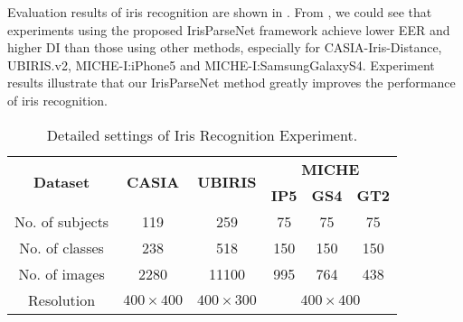 \documentclass[journal]{IEEEtran}
\begin{document}
Evaluation results of iris recognition are shown in .
From , we could see that experiments using the proposed IrisParseNet framework achieve lower EER and higher DI than those using other methods, especially for CASIA-Iris-Distance, UBIRIS.v2, MICHE-I:iPhone5 and MICHE-I:SamsungGalaxyS4.
Experiment results illustrate that our IrisParseNet method greatly improves the performance of iris recognition.
{\setlength{\belowrulesep}{0pt}
\setlength{\aboverulesep}{-2pt}
\vspace{-10pt}
\begin{table}[!htb]
  \centering
  \renewcommand{\arraystretch}{1.1}
  \setlength\tabcolsep{5pt}
  \caption{Detailed settings of Iris Recognition Experiment.}\label{tab:setting}\begin{tabular}{c|c|c|c|c|c}
    \hline
    \multirow{2}[4]{*}{\bfseries Dataset} & \multirow{2}[4]{*}{\bfseries CASIA} & \multirow{2}[4]{*}{\bfseries UBIRIS} & \multicolumn{3}{c}{\bfseries MICHE}\\
   \cmidrule(r){4-6}
    &  &  &\bfseries IP5&\bfseries GS4 &\bfseries GT2\\
      \hline
    No. of subjects &  119& 259 & 75 & 75  & 75 \\   \hline
    No. of classes &  238& 518 & 150  & 150& 150 \\   \hline
    No. of images & 2280 &  11100& 995 &764 &438 \\  \hline
    Resolution & $400\times 400$& $400\times 300$&\multicolumn{3}{c}{$400\times 400$}  \\
     \hline
   \end{tabular}\vspace{-15pt}
\end{table}}
\end{document}
